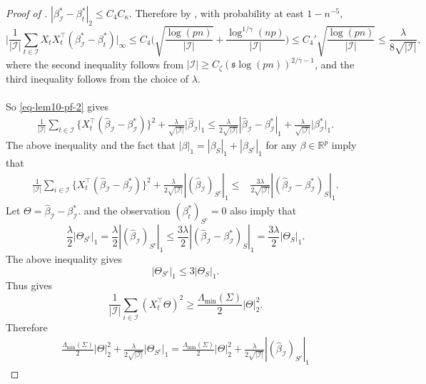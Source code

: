 \documentclass[11pt]{article}
\newcommand{\I}{{\mathcal I }}
\newcommand{\s}{ { \mathfrak{s}  } }
\theoremstyle{plain}
\theoremstyle{definition}
\begin{document}
\begin{proof}[Proof of ]
$ | \beta^*_\I -\beta^* _t |_2 \le C_4 C_\kappa$.
	Therefore by , 
	with probability at east $1-n^{-5}$,
	$$\bigg|  \frac{1}{|\I| }\sum_{ t   \in \I} X_ t  X_t  ^\top (\beta^*  _\I  -\beta^*_t  )   \bigg|_\infty \le  C _4 \bigg (   \sqrt { \frac{\log(pn) }{|\I| }  }  +   \frac{ \log^{1/\gamma }(np) }{|\I| }  \bigg)  \le C_4' \sqrt { \frac{\log(pn) }{|\I| }  }   \le \frac{\lambda }{ 8 \sqrt {|\I| }}, $$ where the  second   inequality follows from 
	$| \mathcal I | \ge  C_{\zeta}   (\s \log(pn)) ^{2/ \gamma  - 1}  $, and the third  inequality follows from the choice of $\lambda$.  
 \\
	\\
	So   \eqref{eq-lem10-pf-2}  gives 
	\begin{align*}
		  \frac{1}{|\I | }	  \sum_{ t   \in \I} \bigl\{X_t  ^{\top}(\widehat{\beta} _\I  - \beta^*_\I )\bigr\}^2 + \frac{ \lambda}{ \sqrt{  |\I|  }} \bigl |\widehat{\beta}_\I \bigr |_1  
		 \leq  \frac{\lambda}{2\sqrt { |\I| } }    |\widehat{\beta}_\I  - \beta^*_\I  |_1  
		+  \frac{ \lambda}{ \sqrt{  |\I|  }}    \bigl |\beta^*_\I \bigr |_1   .	 
	\end{align*} 
 The above inequality and the fact that $|\beta | _1 =|\beta_S|_1 + |\beta_{S^c} |_1 $ for any $\beta \in \mathbb R^p$  imply that 
\begin{align}
\label{eq:two sample lasso deviation 1} \frac{1}{|\I|} \sum_{i \in \I } \big\{  X_t^\top   (\widehat  \beta _\I   - \beta^*_\I  )  \big\} ^2 + \frac{ \lambda}{2\sqrt{  |\I|  } } |  (\widehat \beta _\I)   _{ S ^c} |_1  
 \le & \frac{3\lambda}{2\sqrt{  |\I|  }  }  | ( \widehat  \beta _\I  -  \beta^*_\I  )    _{S}  | _1  .
 \end{align} 
 Let $\Theta = \widehat  \beta _\I   - \beta^*_\I   $.    and the observation $(\beta_t^*)_{S^c}  = 0  $
 also imply that 
$$ \frac{\lambda }{2} | \Theta _{S^c}   |_1 = \frac{ \lambda}{2 } |   (\widehat \beta_\I)  _{ S ^c} |_1    \le  
\frac{3\lambda}{2 }  |  ( \widehat  \beta _\I   - \beta^* _\I  ) _{S}  | _1  = \frac{3\lambda}{2 }  |  \Theta  _{S}  | _1 . $$
The above inequality gives 
$$ |\Theta_{S^c} |_1 \le 3 | \Theta _{S}|_1 .$$ Thus  gives 
$$ \frac{1}{|\I| } \sum_{i \in \I }  \left( X_t^\top  \Theta \right)^2   
\ge 
 \frac{\Lambda_{\min} (\Sigma) } {2 }  | \Theta|_2^2     .$$
Therefore
\begin{align}
\label{eq:two sample lasso deviation 2} \frac{\Lambda_{\min} (\Sigma) } {2 }  | \Theta|_2^2    + \frac{ \lambda}{2\sqrt{  |\I|  }  } | \Theta  _{ S ^c} |_1    =   \frac{\Lambda_{\min} (\Sigma) } {2 }  | \Theta|_2^2    + \frac{ \lambda}{2\sqrt{  |\I|  }  } | ( \widehat \beta_\I    ) _{ S ^c} |_1    

\end{align}
\end{proof}
\end{document}
